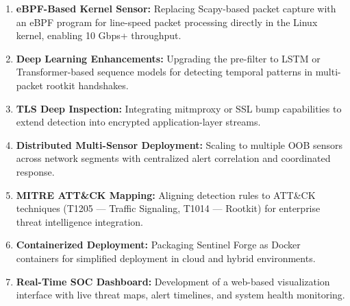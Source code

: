 \begin{enumerate}
    \item \textbf{eBPF-Based Kernel Sensor:} Replacing Scapy-based packet capture with an eBPF program for line-speed packet processing directly in the Linux kernel, enabling 10 Gbps+ throughput.
    
    \item \textbf{Deep Learning Enhancements:} Upgrading the pre-filter to LSTM or Transformer-based sequence models for detecting temporal patterns in multi-packet rootkit handshakes.
    
    \item \textbf{TLS Deep Inspection:} Integrating mitmproxy or SSL bump capabilities to extend detection into encrypted application-layer streams.
    
    \item \textbf{Distributed Multi-Sensor Deployment:} Scaling to multiple OOB sensors across network segments with centralized alert correlation and coordinated response.
    
    \item \textbf{MITRE ATT\&CK Mapping:} Aligning detection rules to ATT\&CK techniques (T1205 --- Traffic Signaling, T1014 --- Rootkit) for enterprise threat intelligence integration.
    
    \item \textbf{Containerized Deployment:} Packaging Sentinel Forge as Docker containers for simplified deployment in cloud and hybrid environments.
    
    \item \textbf{Real-Time SOC Dashboard:} Development of a web-based visualization interface with live threat maps, alert timelines, and system health monitoring.
\end{enumerate}
